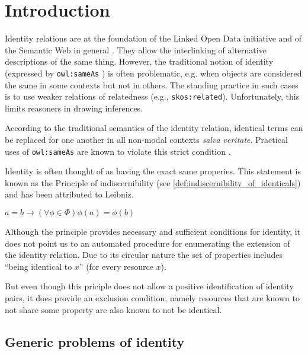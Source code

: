\section{Introduction}
\label{sec:introduction}

Identity relations are at the foundation of the Linked Open Data initiative
  and of the Semantic Web in general \cite{bizer_cyganiak_heath_2007}.
They allow the interlinking of alternative descriptions of the same thing.
However, the traditional notion of identity
  (expressed by \verb|owl:sameAs| \cite{motic_paterschneider_grau_2012})
  is often problematic, e.g. when objects are considered the same in some
  contexts but not in others.
The standing practice in such cases is to use weaker relations of relatedness
  (e.g., \verb|skos:related|).
Unfortunately, this limits reasoners in drawing inferences.

According to the traditional semantics of the identity relation,
  identical terms can be replaced for one another in all non-modal contexts
  \emph{salva veritate}.
Practical uses of \verb|owl:sameAs| are known to violate this strict condition
  \cite{halpin_hayes_2010,halpin_hayes_mccusker_mcguinness_thompson_2010}.

Identity is often thought of as having the exact same properies.
This statement is known as the Principle of indiscernibility
(see \ref{def:indiscernibility_of_identicals})
and has been attributed to Leibniz.\cite{TODO}

\begin{definition}
\label{def:indiscernibility_of_identicals}
$a = b \rightarrow (\forall \phi \in \Phi) \phi(a) = \phi(b)$
\end{definition}

Although the principle provides necessary and sufficient conditions
for identity, it does not point us to an automated procedure
for enumerating the extension of the identity relation.
Due to its circular nature the set of properties includes
``being identical to $x$'' (for every resource $x$).

But even though this priciple does not
allow a positive identification of identity pairs,
it does provide an exclusion condition,
namely resources that are known to not share some property
are also known to not be identical.

\subsection{Generic problems of identity}

